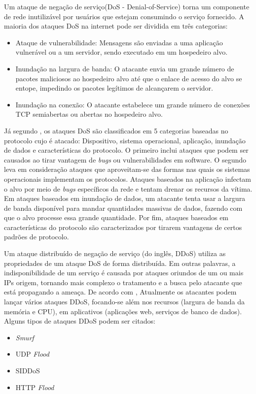 Um ataque de negação de serviço(DoS - Denial-of-Service) torna um componente de rede inutilizável por usuários que estejam consumindo o serviço fornecido. A maioria dos ataques DoS na internet pode ser dividida em três categorias: \cite{kurose}
\begin{itemize}
	\item Ataque de vulnerabilidade: Mensagens são enviadas a uma aplicação vulnerável ou a um servidor, sendo executado em um hospedeiro alvo.
	\item Inundação na largura de banda: O atacante envia um grande número de pacotes maliciosos ao hospedeiro alvo até que o enlace de acesso do alvo se entope, impedindo os pacotes legítimos de alcançarem o servidor. 
	\item Inundação na conexão: O atacante estabelece um grande número de conexões TCP semiabertas ou abertas no hospedeiro alvo. 
\end{itemize}
Já segundo \cite{ddosatacks}, os ataques DoS são classificados em 5 categorias baseadas no protocolo cujo é atacado: Dispositivo, sistema operacional, aplicação, inundação de dados e características do protocolo. O primeiro inclui ataques que podem ser causados ao tirar vantagem de \textit{bugs} ou vulnerabilidades em software. O segundo leva em consideração ataques que aproveitam-se das formas nas quais os sistemas operacionais implementam os protocolos. Ataques baseados na aplicação infectam o alvo por meio de \textit{bugs} específicos da rede e tentam drenar os recursos da vítima. Em ataques baseados em inundação de dados, um atacante tenta usar a largura de banda disponível para mandar quantidades massivas de dados, fazendo com que o alvo processe essa grande quantidade. Por fim, ataques baseados em características do protocolo são caracterizados por tirarem vantagens de certos padrões de protocolo.
 
Um ataque distribuído de negação de serviço (do inglês, DDoS) utiliza as propriedades de um ataque DoS de forma distribuída. Em outras palavras, a indisponibilidade de um serviço é causada por ataques oriundos de um ou mais IPs origem, tornando mais complexo o tratamento e a busca pelo atacante que está propagando a ameaça. De acordo com \cite{WANG2015308}, Atualmente os atacantes podem lançar vários ataques DDoS, focando-se além nos recursos (largura de banda da memória e CPU), em aplicativos (aplicações web, serviços de banco de dados). Alguns tipos de ataques DDoS podem ser citados:

\begin{itemize}
	 \item \textit{Smurf}
	 \item UDP \textit{Flood}
	 \item SIDDoS
	 \item HTTP \textit{Flood}
\end{itemize}

